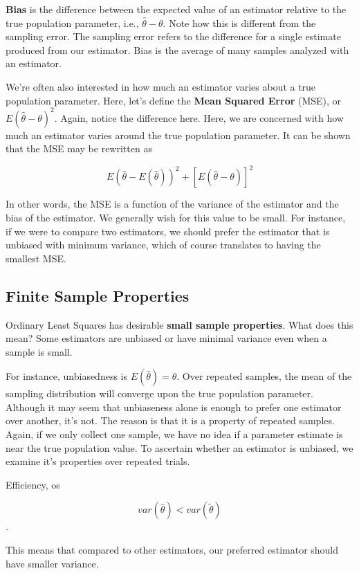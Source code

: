 \documentclass[
]{book}
\begin{document}
\textbf{Bias} is the difference between the expected value of an estimator relative to the true population parameter, i.e., \(\hat{\theta}-\theta\). Note how this is different from the sampling error. The sampling error refers to the difference for a single estimate produced from our estimator. Bias is the average of many samples analyzed with an estimator.

We're often also interested in how much an estimator varies about a true population parameter. Here, let's define the \textbf{Mean Squared Error} (MSE), or \(E(\hat{\theta}-\theta)^2\). Again, notice the difference here. Here, we are concerned with how much an estimator varies around the true population parameter. It can be shown that the MSE may be rewritten as

\[E(\hat{\theta}-E(\hat{\theta}))^2 +[E(\hat{\theta}-\theta)]^2\]

In other words, the MSE is a function of the variance of the estimator and the bias of the estimator. We generally wish for this value to be small. For instance, if we were to compare two estimators, we should prefer the estimator that is unbiased with minimum variance, which of course translates to having the smallest MSE.

\subsection{Finite Sample Properties}\label{finite-sample-properties}

Ordinary Least Squares has desirable \textbf{small sample properties}. What does this mean? Some estimators are unbiased or have minimal variance even when a sample is small.

For instance, unbiasedness is \(E(\hat{\theta})=\theta\). Over repeated samples, the mean of the sampling distribution will converge upon the true population parameter. Although it may seem that unbiaseness alone is enough to prefer one estimator over another, it's not. The reason is that it is a property of repeated samples. Again, if we only collect one sample, we have no idea if a parameter estimate is near the true population value. To ascertain whether an estimator is unbiased, we examine it's properties over repeated trials.

Efficiency, os

\[var(\hat{\theta})<var(\tilde{\theta})\].

This means that compared to other estimators, our preferred estimator should have smaller variance.
\end{document}
